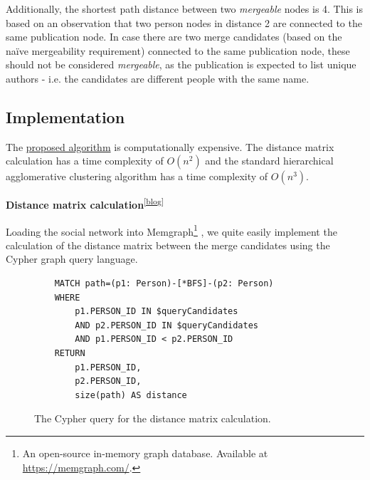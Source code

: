 Additionally, the shortest path distance between two \textit{mergeable} nodes is 4.
This is based on an observation that two person nodes in distance 2 are connected to the same publication node.
In case there are two merge candidates (based on the naïve mergeability requirement) connected to the same publication node,
these should not be considered \textit{mergeable}, as the publication is expected to list unique authors - i.e. the candidates are
different people with the same name.

\subsection{Implementation}

The \hyperref[sec:distance-based-hierarchical-clustering]{proposed algorithm} 
is computationally expensive. The distance matrix calculation has a time complexity of $O(n^2)$
and the standard hierarchical agglomerative clustering algorithm has a time complexity of $O(n^3)$.

\textbf{Distance matrix calculation}\textsuperscript{\href{https://barjin.github.io/edu/thesis-blog/inference-distance-matrix/\#distance-matrix-calculation}{[blog]}}

Loading the social network into Memgraph\footnote{An open-source in-memory graph database. Available at \url{https://memgraph.com/}.}
, we quite easily implement the calculation of the distance matrix between the merge candidates using the Cypher graph query language.

\begin{figure}[!ht]
\begin{verbatim}
    MATCH path=(p1: Person)-[*BFS]-(p2: Person)
    WHERE 
        p1.PERSON_ID IN $queryCandidates 
        AND p2.PERSON_ID IN $queryCandidates
        AND p1.PERSON_ID < p2.PERSON_ID
    RETURN 
        p1.PERSON_ID, 
        p2.PERSON_ID, 
        size(path) AS distance
\end{verbatim}
\captionsetup{width=.9\linewidth}
\caption{The Cypher query for the distance matrix calculation.\protect\footnotemark}
\label{fig:distance-matrix-calculation}
\end{figure}


